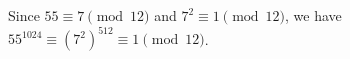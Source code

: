 Since $55\equiv7\pmod{12}$ and $7^2\equiv1\pmod{12}$, we have $55^{1024}\equiv(7^2)^{512}\equiv\boxed1\pmod{12}$.
